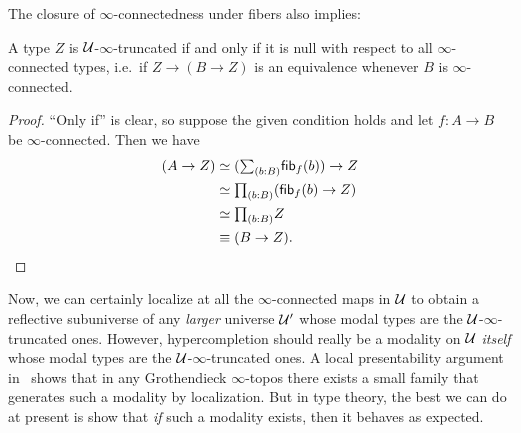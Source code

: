 The closure of $\infty$-connectedness under fibers also implies:

\begin{lem}\label{thm:trunc-null}
  A type $Z$ is $\mathcal{U}$-$\infty$-truncated if and only if it is null with respect to all $\infty$-connected types, i.e.\ if $Z \to (B\to Z)$ is an equivalence whenever $B$ is $\infty$-connected.
\end{lem}
\begin{proof}
  ``Only if'' is clear, so suppose the given condition holds and let $f:A\to B$ be $\infty$-connected.
  Then we have
  \begin{align*}
    (A \to Z)
    &\simeq (\sm{b:B}\fib{f}{b}) \to Z\\
    &\simeq \prd{b:B} (\fib{f}{b} \to Z)\\
    &\simeq \prd{b:B} Z\\
    &\jdeq (B\to Z).\qedhere
  \end{align*}
\end{proof}

Now, we can certainly localize at all the $\infty$-connected maps in $\mathcal{U}$ to obtain a reflective subuniverse of any \emph{larger} universe $\mathcal{U}'$ whose modal types are the $\mathcal{U}$-$\infty$-truncated ones.
However, hypercompletion should really be a modality on $\mathcal{U}$ \emph{itself} whose modal types are the $\mathcal{U}$-$\infty$-truncated ones.
A local presentability argument in~\cite[Prop.~6.5.2.8]{Lurie09} shows that in any Grothendieck $\infty$-topos there exists a small family that generates such a modality by localization.
But in type theory, the best we can do at present is show that \emph{if} such a modality exists, then it behaves as expected.


